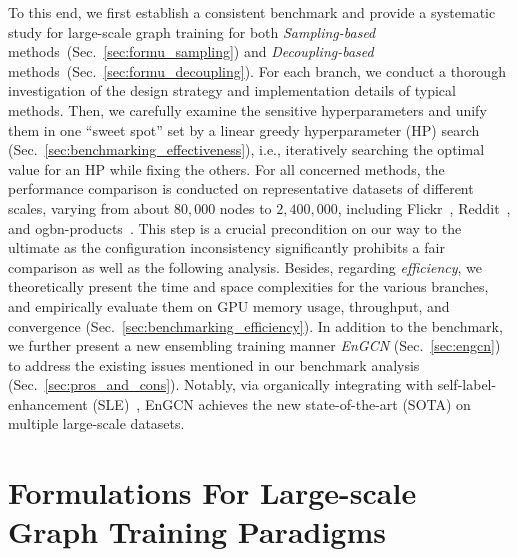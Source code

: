 \message{ !name(main.tex)}\documentclass{article}
\begin{document}
To this end, we first establish a consistent benchmark and provide a systematic study for large-scale graph training for both \textit{Sampling-based} methods~(Sec.~\ref{sec:formu_sampling}) and \textit{Decoupling-based} methods~(Sec.~\ref{sec:formu_decoupling}). For each branch, we conduct a thorough investigation of the design strategy and implementation details of typical methods. Then, we carefully examine the sensitive hyperparameters and unify them in one ``sweet spot'' set by a linear greedy hyperparameter (HP) search (Sec.~\ref{sec:benchmarking_effectiveness}), i.e., iteratively searching the optimal value for an HP while fixing the others. For all concerned methods, the performance comparison is conducted on representative datasets of different scales, varying from about $80,000$ nodes to $2,400,000$, including Flickr~\citep{zeng2019graphsaint}, Reddit~\citep{hamilton2017inductive}, and ogbn-products~\citep{hu2020open}. This step is a crucial precondition on our way to the ultimate as the configuration inconsistency significantly prohibits a fair comparison as well as the following analysis. Besides, regarding \textit{efficiency}, we theoretically present the time and space complexities for the various branches, and empirically evaluate them on GPU memory usage, throughput, and convergence (Sec.~\ref{sec:benchmarking_efficiency}). In addition to the benchmark, we further present a new ensembling training manner \textit{EnGCN} (Sec.~\ref{sec:engcn}) to address the existing issues mentioned in our benchmark analysis (Sec.~\ref{sec:pros_and_cons}). Notably, via organically integrating with self-label-enhancement (SLE)~\cite{sun2021scalable}, EnGCN achieves the new state-of-the-art (SOTA) on multiple large-scale datasets.

\vspace{-1mm}
\section{Formulations For Large-scale Graph Training Paradigms}\label{sec:formulation}
\vspace{-2mm}
\end{document}
